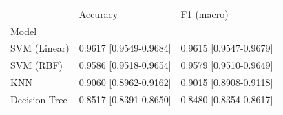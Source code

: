 \begin{tabular}{lll}
\toprule
 & Accuracy & F1 (macro) \\
Model &  &  \\
\midrule
SVM (Linear) & 0.9617 [0.9549-0.9684] & 0.9615 [0.9547-0.9679] \\
SVM (RBF) & 0.9586 [0.9518-0.9654] & 0.9579 [0.9510-0.9649] \\
KNN & 0.9060 [0.8962-0.9162] & 0.9015 [0.8908-0.9118] \\
Decision Tree & 0.8517 [0.8391-0.8650] & 0.8480 [0.8354-0.8617] \\
\bottomrule
\end{tabular}
